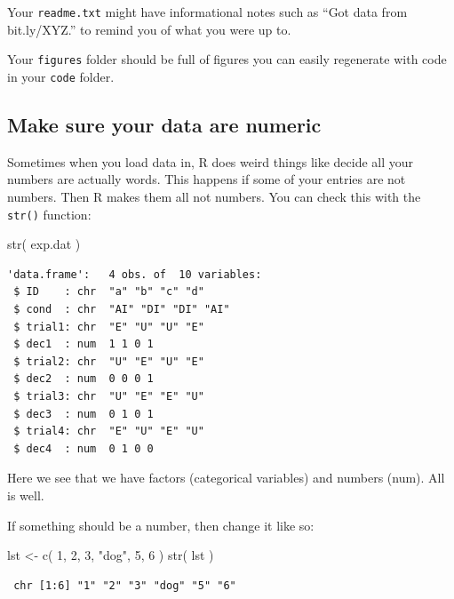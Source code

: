 \documentclass[
  letterpaper,
  DIV=11,
  numbers=noendperiod]{scrreprt}
\newenvironment{Shaded}{}{}
\newcommand{\DecValTok}[1]{\textcolor[rgb]{0.25,0.63,0.44}{#1}}
\newcommand{\FunctionTok}[1]{\textcolor[rgb]{0.02,0.16,0.49}{#1}}
\newcommand{\NormalTok}[1]{#1}
\newcommand{\OtherTok}[1]{\textcolor[rgb]{0.00,0.44,0.13}{#1}}
\newcommand{\StringTok}[1]{\textcolor[rgb]{0.25,0.44,0.63}{#1}}
\begin{document}
Your \texttt{readme.txt} might have informational notes such as ``Got
data from bit.ly/XYZ.'' to remind you of what you were up to.

Your \texttt{figures} folder should be full of figures you can easily
regenerate with code in your \texttt{code} folder.

\subsection{Make sure your data are
numeric}\label{make-sure-your-data-are-numeric}

Sometimes when you load data in, R does weird things like decide all
your numbers are actually words. This happens if some of your entries
are not numbers. Then R makes them all not numbers. You can check this
with the \texttt{str()} function:

\begin{Shaded}
\begin{Highlighting}[]
\FunctionTok{str}\NormalTok{( exp.dat )}
\end{Highlighting}
\end{Shaded}

\begin{verbatim}
'data.frame':   4 obs. of  10 variables:
 $ ID    : chr  "a" "b" "c" "d"
 $ cond  : chr  "AI" "DI" "DI" "AI"
 $ trial1: chr  "E" "U" "U" "E"
 $ dec1  : num  1 1 0 1
 $ trial2: chr  "U" "E" "U" "E"
 $ dec2  : num  0 0 0 1
 $ trial3: chr  "U" "E" "E" "U"
 $ dec3  : num  0 1 0 1
 $ trial4: chr  "E" "U" "E" "U"
 $ dec4  : num  0 1 0 0
\end{verbatim}

Here we see that we have factors (categorical variables) and numbers
(num). All is well.

If something should be a number, then change it like so:

\begin{Shaded}
\begin{Highlighting}[]
\NormalTok{lst }\OtherTok{\textless{}{-}}  \FunctionTok{c}\NormalTok{( }\DecValTok{1}\NormalTok{, }\DecValTok{2}\NormalTok{, }\DecValTok{3}\NormalTok{, }\StringTok{"dog"}\NormalTok{, }\DecValTok{5}\NormalTok{, }\DecValTok{6}\NormalTok{ )}
\FunctionTok{str}\NormalTok{( lst )}
\end{Highlighting}
\end{Shaded}

\begin{verbatim}
 chr [1:6] "1" "2" "3" "dog" "5" "6"
\end{verbatim}
\end{document}
